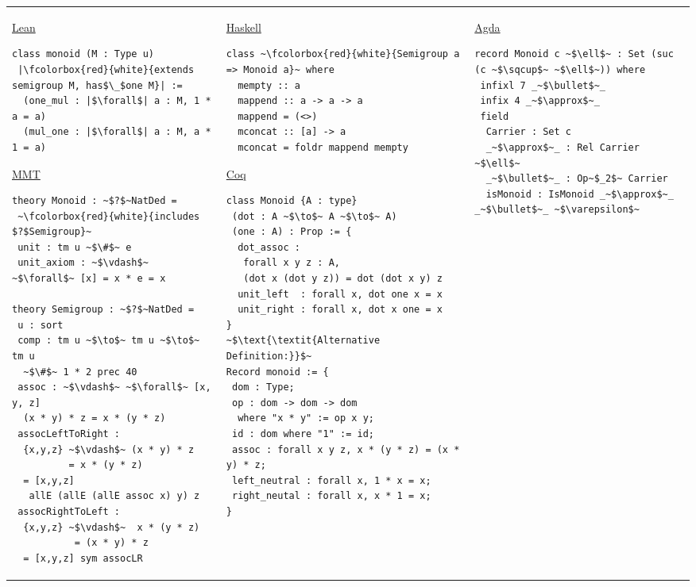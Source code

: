 \footnotesize
\begin{adjustbox}{width=1.2\columnwidth,center}
\begin{tabular}{p{7cm} p{7cm} p{7cm}}  
\underline{Lean}
\begin{verbatim} 
class monoid (M : Type u)
 |\fcolorbox{red}{white}{extends semigroup M, has$\_$one M}| :=
  (one_mul : |$\forall$| a : M, 1 * a = a) 
  (mul_one : |$\forall$| a : M, a * 1 = a)   
\end{verbatim} 
\vspace{0.5cm}
\underline{MMT}
\begin{verbatim}
theory Monoid : ~$?$~NatDed = 
 ~\fcolorbox{red}{white}{includes $?$Semigroup}~ 
 unit : tm u ~$\#$~ e 
 unit_axiom : ~$\vdash$~ ~$\forall$~ [x] = x * e = x    
 
theory Semigroup : ~$?$~NatDed = 
 u : sort 
 comp : tm u ~$\to$~ tm u ~$\to$~ tm u 
  ~$\#$~ 1 * 2 prec 40
 assoc : ~$\vdash$~ ~$\forall$~ [x, y, z]
  (x * y) * z = x * (y * z)    
 assocLeftToRight : 
  {x,y,z} ~$\vdash$~ (x * y) * z 
          = x * (y * z) 
  = [x,y,z] 
   allE (allE (allE assoc x) y) z
 assocRightToLeft : 
  {x,y,z} ~$\vdash$~  x * (y * z) 
           = (x * y) * z 
  = [x,y,z] sym assocLR    
\end{verbatim}     
&
\underline{Haskell}
\begin{verbatim}
class ~\fcolorbox{red}{white}{Semigroup a => Monoid a}~ where 
  mempty :: a 
  mappend :: a -> a -> a 
  mappend = (<>) 
  mconcat :: [a] -> a 
  mconcat = foldr mappend mempty 
\end{verbatim} 
\vspace{0.5cm}
\underline{Coq}
\begin{verbatim}
class Monoid {A : type}
 (dot : A ~$\to$~ A ~$\to$~ A)
 (one : A) : Prop := {
  dot_assoc : 
   forall x y z : A, 
   (dot x (dot y z)) = dot (dot x y) z
  unit_left  : forall x, dot one x = x 
  unit_right : forall x, dot x one = x              
}
~$\text{\textit{Alternative Definition:}}$~
Record monoid := {
 dom : Type; 
 op : dom -> dom -> dom 
  where "x * y" := op x y; 
 id : dom where "1" := id; 
 assoc : forall x y z, x * (y * z) = (x * y) * z; 
 left_neutral : forall x, 1 * x = x; 
 right_neutal : forall x, x * 1 = x; 
}
\end{verbatim} 
&
\underline{Agda}
\begin{verbatim} 
record Monoid c ~$\ell$~ : Set (suc (c ~$\sqcup$~ ~$\ell$~)) where 
 infixl 7 _~$\bullet$~_
 infix 4 _~$\approx$~_
 field 
  Carrier : Set c 
  _~$\approx$~_ : Rel Carrier ~$\ell$~ 
  _~$\bullet$~_ : Op~$_2$~ Carrier 
  isMonoid : IsMonoid _~$\approx$~_ _~$\bullet$~_ ~$\varepsilon$~ 
  

\end{verbatim}
\end{tabular}
\end{adjustbox}
